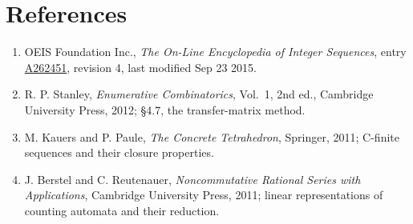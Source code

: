 \documentclass[11pt]{article}
\theoremstyle{definition}
\begin{document}
\section{References}

\begin{enumerate}

\item OEIS Foundation Inc., \emph{The On-Line Encyclopedia of Integer Sequences}, entry \href{https://oeis.org/A262451}{A262451}, revision 4, last modified Sep 23 2015.

\item R. P. Stanley, \emph{Enumerative Combinatorics}, Vol.~1, 2nd ed., Cambridge University Press, 2012; \S4.7, the transfer-matrix method.

\item M. Kauers and P. Paule, \emph{The Concrete Tetrahedron}, Springer, 2011; C-finite sequences and their closure properties.

\item J. Berstel and C. Reutenauer, \emph{Noncommutative Rational Series with Applications}, Cambridge University Press, 2011; linear representations of counting automata and their reduction.

\end{enumerate}
\end{document}
